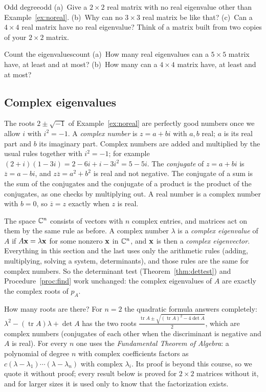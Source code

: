 \documentclass[11pt]{article}
\begin{document}
\begin{think}{Odd degree}{odd}
(a)~Give a $2\times2$ real matrix with no real eigenvalue other than Example~\ref{ex:noreal}. (b)~Why can no $3\times3$ real matrix be like that? (c)~Can a $4\times4$ real matrix have no real eigenvalue? Think of a matrix built from two copies of your $2\times2$ matrix.
\end{think}

\begin{kc}{Count the eigenvalues}{count}
(a)~How many real eigenvalues can a $5\times5$ matrix have, at least and at most? (b)~How many can a $4\times4$ matrix have, at least and at most?
\end{kc}

\subsection*{Complex eigenvalues}

The roots $2\pm\sqrt{-1}$ of Example~\ref{ex:noreal} are perfectly good numbers once we allow $i$ with $i^2=-1$. A \emph{complex number} is $z=a+bi$ with $a,b$ real; $a$ is its real part and $b$ its imaginary part. Complex numbers are added and multiplied by the usual rules together with $i^2=-1$; for example $(2+i)(1-3i)=2-6i+i-3i^2=5-5i$. The \emph{conjugate} of $z=a+bi$ is $\overline{z}=a-bi$, and $z\overline{z}=a^2+b^2$ is real and not negative. The conjugate of a sum is the sum of the conjugates and the conjugate of a product is the product of the conjugates, as one checks by multiplying out. A real number is a complex number with $b=0$, so $\overline{z}=z$ exactly when $z$ is real.

The space $\mathbb{C}^n$ consists of vectors with $n$ complex entries, and matrices act on them by the same rule as before. A complex number $\lambda$ is a \emph{complex eigenvalue} of $A$ if $A\mathbf{x}=\lambda\mathbf{x}$ for some nonzero $\mathbf{x}$ in $\mathbb{C}^n$, and $\mathbf{x}$ is then a \emph{complex eigenvector}. Everything in this section and the last uses only the arithmetic rules (adding, multiplying, solving a system, determinants), and those rules are the same for complex numbers. So the determinant test (Theorem~\ref{thm:dettest}) and Procedure~\ref{proc:find} work unchanged: the complex eigenvalues of $A$ are exactly the complex roots of $p_A$.

How many roots are there? For $n=2$ the quadratic formula answers completely: $\lambda^2-(\operatorname{tr}A)\lambda+\det A$ has the two roots $\frac{\operatorname{tr}A\pm\sqrt{(\operatorname{tr}A)^2-4\det A}}{2}$, which are complex numbers (conjugates of each other when the discriminant is negative and $A$ is real). For every $n$ one uses the \emph{Fundamental Theorem of Algebra}: a polynomial of degree $n$ with complex coefficients factors as $c(\lambda-\lambda_1)\cdots(\lambda-\lambda_n)$ with complex $\lambda_i$. Its proof is beyond this course, so we quote it without proof; every result below is proved for $2\times2$ matrices without it, and for larger sizes it is used only to know that the factorization exists.
\end{document}
